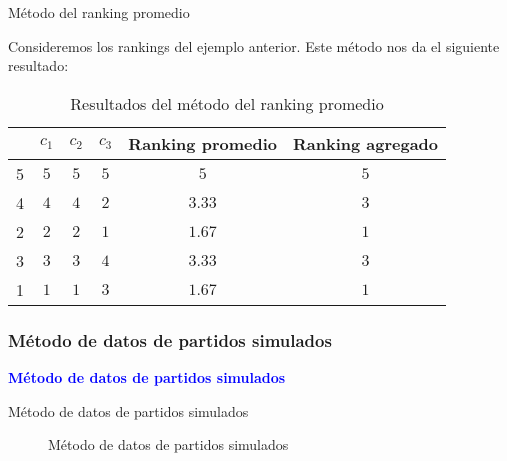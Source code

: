 \documentclass[10pt,hyperref={unicode}]{beamer}
\begin{document}
	\begin{frame}{Método del ranking promedio}
		\begin{ejemplo}
			Consideremos los rankings del ejemplo anterior. Este método nos da el siguiente resultado:
			
			\begin{table}[h]
				\centering
				\caption{Resultados del método del ranking promedio}
				\label{tbl:promedio_resultados}
				\begin{tabular}{@{}cccccc@{}}
					\cmidrule(l){2-6}
					& $c_1$ & $c_2$ & $c_3$ & Ranking promedio & Ranking agregado \\ \midrule
					5 & $5$    & $5$    & $5$    & $5$              & $5$              \\
					4 & $4$    & $4$    & $2$    & $3.33$           & $3$              \\
					2 & $2$    & $2$    & $1$    & $1.67$           & $1$              \\
					3 & $3$    & $3$    & $4$    & $3.33$           & $3$              \\
					1 & $1$    & $1$    & $3$    & $1.67$           & $1$              \\ \bottomrule
				\end{tabular}
			\end{table} 
		\end{ejemplo}
	\end{frame}
	
	\subsubsection{Método de datos de partidos simulados}
	
	\begin{frame}
		\begin{center}
			\Huge\textbf{\textsf{\textcolor{blue}{Método de datos de partidos simulados}}}
		\end{center}
	\end{frame}
	
	\begin{frame}{Método de datos de partidos simulados}
		\begin{figure}
			\centering
			\resizebox{.6\linewidth}{!}{\partidossimulados}
			\caption{Método de datos de partidos simulados}
			\label{fig:partidos_simulados}
		\end{figure}
	\end{frame}
	
\end{document}
